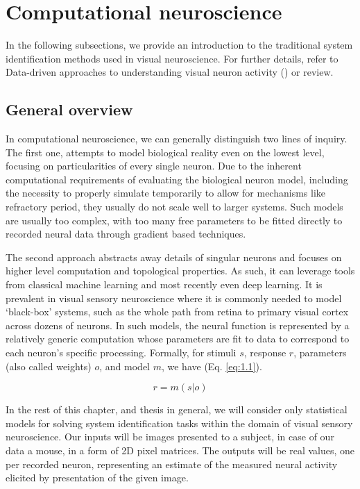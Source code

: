 \section{Computational neuroscience}

In the following subsections, we provide an introduction to the traditional system identification methods used in visual neuroscience. For further details, refer to Data-driven approaches to understanding visual neuron activity (\cite{doi:10.1146/annurev-vision-091718-014731}) or \cite{Carandini10577} review.

\subsection{General overview}

In computational neuroscience, we can generally distinguish two lines of inquiry. The first one, attempts to model biological reality even on the lowest level, focusing on particularities of every single neuron. Due to the inherent computational requirements of evaluating the biological neuron model, including the necessity to properly simulate temporarily to allow for mechanisms like refractory period, they usually do not scale well to larger systems. Such models are usually too complex, with too many free parameters to be fitted directly to recorded neural data through gradient based techniques. 

The second approach abstracts away details of singular neurons and focuses on higher level computation and topological properties. As such, it can leverage tools from classical machine learning and most recently even deep learning. It is prevalent in visual sensory neuroscience where it is commonly needed to model ‘black-box’ systems, such as the whole path from retina to primary visual cortex across dozens of neurons. In such models, the neural function is represented by a relatively generic computation whose parameters are fit to data to correspond to each neuron’s specific processing. Formally, for stimuli $s$, response $r$, parameters (also called weights) $o$, and model $m$, we have (Eq. \ref{eq:1.1}).

\begin{equation}\label{eq:1.1}
    r=m(s|o)
\end{equation}

In the rest of this chapter, and thesis in general, we will consider only statistical models for solving system identification tasks within the domain of visual sensory neuroscience. Our inputs will be images presented to a subject, in case of our data a mouse, in a form of 2D pixel matrices. The outputs will be real values, one per recorded neuron, representing an estimate of the measured neural activity elicited by presentation of the given image.

